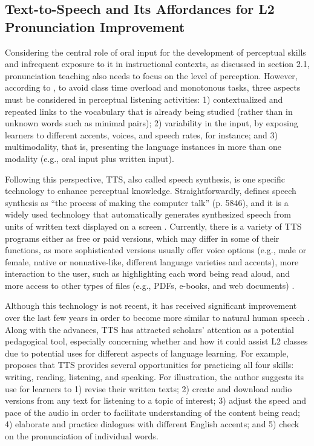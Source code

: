 \documentclass[english]{textolivre}
\begin{document}
\subsection{Text-to-Speech and Its Affordances for L2 Pronunciation Improvement}\label{sec-3.2}
Considering the central role of oral input for the development of perceptual skills and infrequent exposure to it in instructional contexts, as discussed in section 2.1, pronunciation teaching also needs to focus on the level of perception. However, according to \textcite{darcy2018}, to avoid class time overload and monotonous tasks, three aspects must be considered in perceptual listening activities: 1) contextualized and repeated links to the vocabulary that is already being studied (rather than in unknown words such as minimal pairs); 2) variability in the input, by exposing learners to different accents, voices, and speech rates, for instance; and 3) multimodality, that is, presenting the language instances in more than one modality (e.g., oral input plus written input).

Following this perspective, TTS, also called speech synthesis, is one specific technology to enhance perceptual knowledge. Straightforwardly, \textcite{handley2013} defines speech synthesis as “the process of making the computer talk” (p. 5846), and it is a widely used technology that automatically generates synthesized speech from units of written text displayed on a screen \cite{liakin2017}. Currently, there is a variety of TTS programs either as free or paid versions, which may differ in some of their functions, as more sophisticated versions usually offer voice options (e.g., male or female, native or nonnative-like, different language varieties and accents), more interaction to the user, such as highlighting each word being read aloud, and more access to other types of files (e.g., PDFs, e-books, and web documents) \cite{moon2012}.

Although this technology is not recent, it has received significant improvement over the last few years in order to become more similar to natural human speech \cite{handley2013, liakin2017, moon2012}. Along with the advances, TTS has attracted scholars’ attention as a potential pedagogical tool, especially concerning whether and how it could assist L2 classes due to potential uses for different aspects of language learning. For example, \textcite{moon2012} proposes that TTS provides several opportunities for practicing all four skills: writing, reading, listening, and speaking. For illustration, the author suggests its use for learners to 1) revise their written texts; 2) create and download audio versions from any text for listening to a topic of interest; 3) adjust the speed and pace of the audio in order to facilitate understanding of the content being read; 4) elaborate and practice dialogues with different English accents; and 5) check on the pronunciation of individual words.
\end{document}
